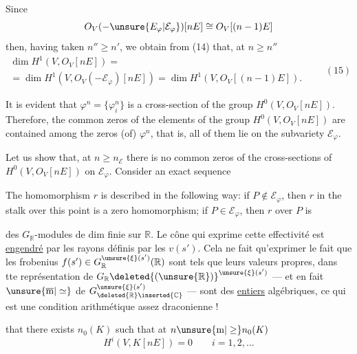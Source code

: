 
Since
\[
O_V(-\unsure{E_{\varphi}|\mathcal E_{\varphi}})[nE]\cong O_V[(n-1)E]
\]
then, having taken $n''\geq n'$, we obtain from (14) that, at $n\geq n''$
\[
\begin{gathered}
\dim H^1(V,O_V[nE])=\\[6pt]
=\dim H^1(V,O_V(-\mathcal E_{\varphi})[nE])=\dim H^1(V,O_V[(n-1)E]).
\end{gathered}\qquad(15)
\]

It is evident that $\varphi^n=\{\varphi_i^n\}$ is a cross-section of the group $H^0(V,O_V[nE])$. Therefore, the common zeros of the elements of the group $H^0(V,O_V[nE])$ are contained among the zeros (of) $\varphi^n$, that is, all of them lie on the subvariety $\mathcal E_{\varphi}$.

Let us show that, at $n\geq n_{\mathcal E}$ there is no common zeros of the cross-sections of $H^0(V,O_V[nE])$ on $\mathcal E_{\varphi}$.
Consider an exact sequence

The homomorphism $r$ is described in the following way: if $P\notin\mathcal E_{\varphi}$, then $r$ in the stalk over this point is a zero homomorphism; if $P\in\mathcal E_{\varphi}$, then $r$ over $P$ is


des $G_{\mathbb R}$-modules de dim finie sur $\mathbb R$. Le cône
qui exprime cette effectivité est \uline{engendré}
par les  rayons définis par les $v(s')$.
Cela ne fait qu'exprimer  le fait que les
frobenius $f(s')\in G_{\mathbb R}^{\unsure{\xi}(s')}(\mathbb R)$ sont tels
que leurs valeurs propres, dans tte représentation
de $G_{\mathbb R}\deleted{(\unsure{\mathbb R})}^{\unsure{\xi}(s')}$ --- et en fait $\unsure{\overline{\mathrm m}|\simeq}$ de
$G_{\deleted{\mathbb R}\inserted{\mathbb C}}^{\unsure{\xi}(s')}$ --- sont des \uline{entiers} algébriques, ce qui est une
condition arithmétique assez draconienne !


that there exists $n_0(K)$ such that at $n\unsure{\mathrm m|\geq}n_0(K)$
\[
H^i(V,K[nE])=0\qquad i=1,2,\ldots
\]

